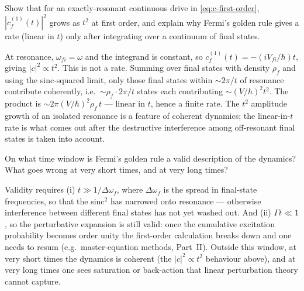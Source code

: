 \begin{exercise}
Show that for an exactly-resonant continuous drive in
\cref{eq:c-first-order}, $|c_f^{(1)}(t)|^2$ grows as $t^2$ at
first order, and explain why Fermi's golden rule gives a rate
(linear in $t$) only after integrating over a continuum of final
states.
\begin{solution}
At resonance, $\omega_{fi}=\omega$ and the integrand is constant,
so $c_f^{(1)}(t)=-(iV_{fi}/\hbar)t$, giving $|c|^2\propto t^2$.
This is not a rate. Summing over final states with density
$\rho_f$ and using the sinc-squared limit, only those final
states within $\sim 2\pi/t$ of resonance contribute coherently,
i.e.\ $\sim\rho_f\cdot 2\pi/t$ states each contributing $\sim
(V/\hbar)^2 t^2$. The product is $\sim 2\pi (V/\hbar)^2 \rho_f\,t$
--- linear in $t$, hence a finite rate. The $t^2$ amplitude growth
of an isolated resonance is a feature of coherent dynamics; the
linear-in-$t$ rate is what comes out after the destructive
interference among off-resonant final states is taken into account.
\end{solution}
\end{exercise}

\begin{exercise}
On what time window is Fermi's golden rule a valid description of
the dynamics? What goes wrong at very short times, and at very
long times?
\begin{solution}
Validity requires (i) $t \gg 1/\Delta\omega_f$, where
$\Delta\omega_f$ is the spread in final-state frequencies, so that
the sinc$^2$ has narrowed onto resonance --- otherwise interference
between different final states has not yet washed out. And (ii)
$\Gamma t \ll 1$, so the perturbative expansion is still valid:
once the cumulative excitation probability becomes order unity the
first-order calculation breaks down and one needs to resum (e.g.\
master-equation methods, Part~II). Outside this window, at very
short times the dynamics is coherent (the $|c|^2\propto t^2$
behaviour above), and at very long times one sees saturation or
back-action that linear perturbation theory cannot capture.
\end{solution}
\end{exercise}

